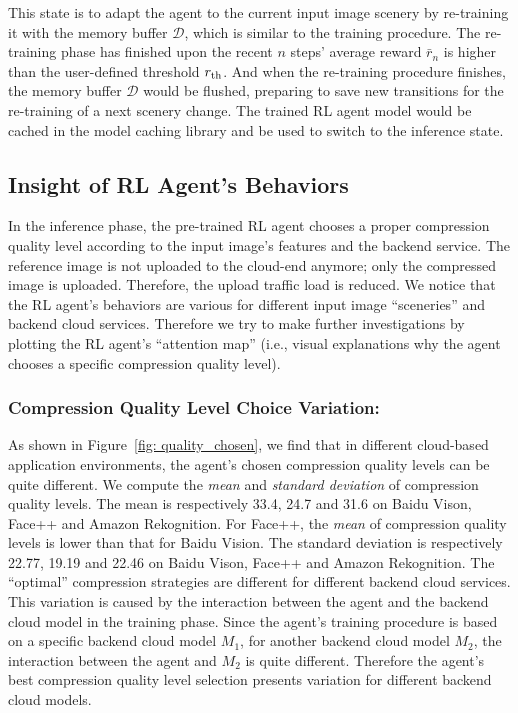 This state is to adapt the agent to the current input image scenery by re-training it with the memory buffer $ \mathcal{D} $, which is similar to the training procedure. The re-training phase has finished upon the recent $ n $ steps' average reward $ \bar{r}_n $ is higher than the user-defined threshold $ r_{\rm th} $. And when the re-training procedure finishes, the memory buffer $ \mathcal{D} $ would be flushed, preparing to save new transitions for the re-training of a next scenery change. The trained RL agent model would be cached in the model caching library and be used to switch to the inference state.

\subsection{Insight of RL Agent's Behaviors}
\label{subsec:insight}

In the inference phase, the pre-trained RL agent chooses a proper compression quality level according to the input image's features and the backend service. The reference image is not uploaded to the cloud-end anymore; only the compressed image is uploaded. Therefore, the upload traffic load is reduced. We notice that the RL agent's behaviors are various for different input image ``sceneries'' and backend cloud services. Therefore we try to make further investigations by plotting the RL agent's ``attention map'' (i.e., visual explanations why the agent chooses a specific compression quality level). %

\subsubsection{Compression Quality Level Choice Variation:}

\textcolor{revise}{As shown in Figure~\ref{fig: quality_chosen}, we find that in different cloud-based application environments, the agent's chosen compression quality levels can be quite different. We compute the \emph{mean} and \emph{standard deviation} of compression quality levels. The mean is respectively 33.4, 24.7 and 31.6 on Baidu Vison, Face++ and Amazon Rekognition. For Face++, the \emph{mean} of compression quality levels is lower than that for Baidu Vision. The standard deviation is respectively 22.77, 19.19 and 22.46 on Baidu Vison, Face++ and Amazon Rekognition.} The ``optimal'' compression strategies are different for different backend cloud services. This variation is caused by the interaction between the agent and the backend cloud model in the training phase. Since the agent's training procedure is based on a specific backend cloud model $ M_1 $, for another backend cloud model $ M_2 $, the interaction between the agent and $ M_2 $ is quite different. Therefore the agent's best compression quality level selection presents variation for different backend cloud models. 

